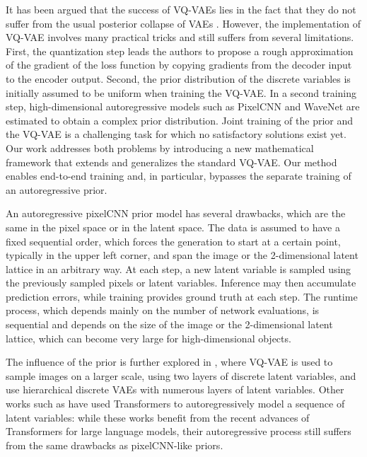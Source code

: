 \documentclass{article}
\theoremstyle{plain}
\theoremstyle{definition}
\theoremstyle{remark}
\begin{document}
 It has been argued that the success of VQ-VAEs lies in the fact that they do not suffer from the usual posterior collapse of VAEs  \cite{oord2017neural}. However, the implementation of VQ-VAE involves many practical tricks and still suffers from several limitations. First, the quantization step leads the authors to propose a rough approximation of the gradient of the loss function by copying gradients from the decoder input to the encoder output. Second, the prior distribution of the discrete variables is initially assumed to be uniform when training the VQ-VAE. In a second training step, high-dimensional autoregressive models such as PixelCNN \cite{oord2016conditional, salimans2017pixelcnn, chen2018pixelsnail} and WaveNet \cite{oord2016wavenet} are estimated to obtain a complex prior distribution. Joint training of the prior and the VQ-VAE is a challenging task for which no satisfactory solutions exist yet. Our work addresses both problems by introducing a new mathematical framework that extends and generalizes the standard VQ-VAE. Our method enables end-to-end training and, in particular, bypasses the separate training of an autoregressive prior.


An autoregressive pixelCNN prior model has several drawbacks, which are the same in the pixel space or in the latent space.  The data is assumed to have a fixed sequential order, which forces the generation to start at a certain point, typically in the upper left corner, and span the image or the 2-dimensional latent lattice in an arbitrary way. At each step, a new latent variable is sampled using the previously sampled pixels or latent variables. Inference may then accumulate prediction errors, while training provides ground truth at each step. 
 The runtime process, which depends mainly on the number of network evaluations, is sequential and depends on the size of the image or the 2-dimensional latent lattice, which can become very large for high-dimensional objects.

 The influence of the prior is further explored in \cite{razavi2019generating}, where VQ-VAE is used to sample images on a larger scale, using two layers of discrete latent variables, and  \cite{willetts:2021} use hierarchical discrete VAEs with numerous layers of latent variables. Other works such as \cite{esser2021taming, ramesh2021zero} have used Transformers to autoregressively model a sequence of latent variables: while these works benefit from the recent advances of Transformers for large language models, their autoregressive process still suffers from the same drawbacks as pixelCNN-like priors.
\end{document}
